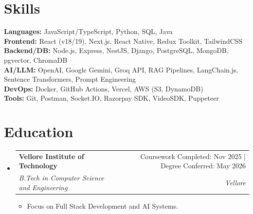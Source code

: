 \documentclass[a4paper,10pt]{article}
\makeatletter
\newcommand{\resumeItem}[1]{
  \item\small{
    {#1 \vspace{-2pt}}
  }
}
\newcommand{\resumeSubheading}[4]{
  \vspace{-2pt}\item
    \begin{tabular*}{\textwidth}{l@{\extracolsep{\fill}}r}
      \textbf{#1} & #2 \\
      \textit{\small#3} & \textit{\small #4} \\
    \end{tabular*}\vspace{-7pt}
}
\newcommand{\resumeSubHeadingListStart}{\begin{itemize}[leftmargin=0.15in, label={}]}
\newcommand{\resumeSubHeadingListEnd}{\end{itemize}}
\newcommand{\resumeItemListStart}{\begin{itemize}}
\newcommand{\resumeItemListEnd}{\end{itemize}\vspace{-5pt}}
\makeatother
\begin{document}
\section{Skills}
 \begin{itemize}[leftmargin=0.15in, label={}]
    \small{\item{
     \textbf{Languages:}{ JavaScript/TypeScript, Python, SQL, Java} \\
     \textbf{Frontend:}{ React (v18/19), Next.js, React Native, Redux Toolkit, TailwindCSS} \\
     \textbf{Backend/DB:}{ Node.js, Express, NestJS, Django, PostgreSQL, MongoDB, pgvector, ChromaDB} \\
     \textbf{AI/LLM:}{ OpenAI, Google Gemini, Groq API, RAG Pipelines, LangChain.js, Sentence Transformers, Prompt Engineering} \\
     \textbf{DevOps:}{ Docker, GitHub Actions, Vercel, AWS (S3, DynamoDB)} \\
     \textbf{Tools:}{ Git, Postman, Socket.IO, Razorpay SDK, VideoSDK, Puppeteer}
    }}
 \end{itemize}

\section{Education}
  \resumeSubHeadingListStart
    \resumeSubheading
      {Vellore Institute of Technology}{Coursework Completed: Nov 2025 | Degree Conferred: May 2026}
      {B.Tech in Computer Science and Engineering}{Vellore}
      \resumeItemListStart
        \resumeItem{Focus on Full Stack Development and AI Systems.}
      \resumeItemListEnd
  \resumeSubHeadingListEnd

\end{document}

